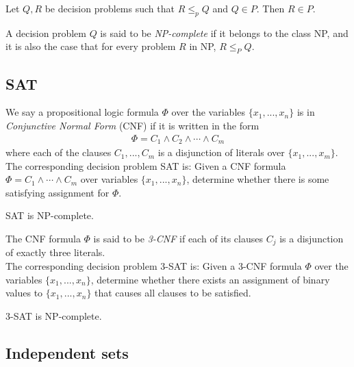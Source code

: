 \documentclass{article}
\begin{document}
\begin{theorem}
	Let $Q,R$ be decision problems such that $R\leq_p Q$ and
	$Q\in P$. Then $R\in P$.
\end{theorem}

\begin{definition}
	A decision problem $Q$ is said to be \emph{NP-complete} if it
	belongs to the class NP, and it is also the case that for every
	problem $R$ in NP, $R\leq_P Q$.
\end{definition}

\subsection{SAT}

\begin{definition}
	We say a propositional logic formula $\Phi$ over the variables
	$\{x_1, ..., x_n\}$ is in \emph{Conjunctive Normal Form} (CNF)
	if it is written in the form
	\begin{align*}
		\Phi = C_1 \wedge C_2 \wedge \cdots \wedge C_m
	\end{align*}
	where each of the clauses $C_1, ..., C_m$ is a disjunction
	of literals over $\{x_1,...,x_m\}$.\\
	The corresponding decision problem SAT is:
	Given a CNF formula $\Phi=C_1\wedge\cdots\wedge C_m$ over
	variables $\{x_1,...,x_n\}$, determine whether there is some
	satisfying assignment for $\Phi$.	
\end{definition}

\begin{theorem}
	SAT is NP-complete.	
\end{theorem}

\begin{definition}
	The CNF formula $\Phi$ is said to be \emph{3-CNF} if each of its clauses
	$C_j$ is a disjunction of exactly three literals.\\
	The corresponding decision problem 3-SAT is:
	Given a 3-CNF formula $\Phi$ over the variables $\{x_1,...,x_n\}$,
	determine whether there exists an assignment of binary values to
	$\{x_1,...,x_n\}$ that causes all clauses to be satisfied.
\end{definition}

\begin{theorem}
	3-SAT is NP-complete.
\end{theorem}

\subsection{Independent sets}
\end{document}
